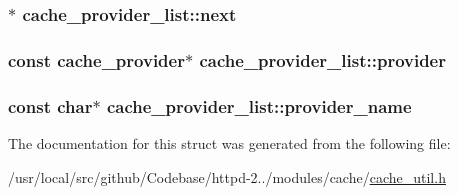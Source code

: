 \subsubsection[{\texorpdfstring{next}{next}}]{$\ast$ cache\+\_\+provider\+\_\+list\+::next}\hypertarget{structcache__provider__list_a87c07afc8bb63fe7fd2e9274e60341a9}{}\label{structcache__provider__list_a87c07afc8bb63fe7fd2e9274e60341a9}
\subsubsection[{\texorpdfstring{provider}{provider}}]{\setlength{\rightskip}{0pt plus 5cm}const {\bf cache\+\_\+provider}$\ast$ cache\+\_\+provider\+\_\+list\+::provider}\hypertarget{structcache__provider__list_a1e1caa5b70698f255962728326dc1be3}{}\label{structcache__provider__list_a1e1caa5b70698f255962728326dc1be3}
\subsubsection[{\texorpdfstring{provider\+\_\+name}{provider_name}}]{\setlength{\rightskip}{0pt plus 5cm}const char$\ast$ cache\+\_\+provider\+\_\+list\+::provider\+\_\+name}\hypertarget{structcache__provider__list_a0bd2adbaa02f1aa6af1971fd24b09b6a}{}\label{structcache__provider__list_a0bd2adbaa02f1aa6af1971fd24b09b6a}


The documentation for this struct was generated from the following file\+:\begin{DoxyCompactItemize}
\item 
/usr/local/src/github/\+Codebase/httpd-\/2../modules/cache/\hyperlink{cache__util_8h}{cache\+\_\+util.\+h}\end{DoxyCompactItemize}
